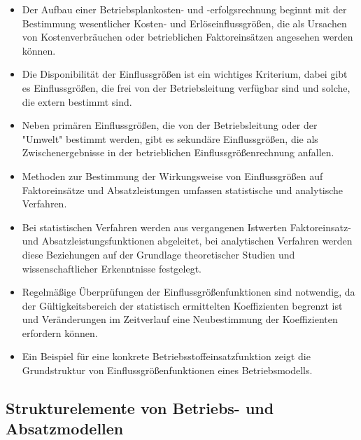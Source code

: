 \begin{itemize}
    \item Der Aufbau einer Betriebsplankosten- und -erfolgsrechnung beginnt mit der Bestimmung wesentlicher Kosten- und Erlöseinflussgrö{\ss}en, die als Ursachen von Kostenverbräuchen oder betrieblichen Faktoreinsätzen angesehen werden können.
    \item Die Disponibilität der Einflussgrö{\ss}en ist ein wichtiges Kriterium, dabei gibt es Einflussgrö{\ss}en, die frei von der Betriebsleitung verfügbar sind und solche, die extern bestimmt sind.
    \item Neben primären Einflussgrö{\ss}en, die von der Betriebsleitung oder der "Umwelt" bestimmt werden, gibt es sekundäre Einflussgrö{\ss}en, die als Zwischenergebnisse in der betrieblichen Einflussgrö{\ss}enrechnung anfallen.
    \item Methoden zur Bestimmung der Wirkungsweise von Einflussgrö{\ss}en auf Faktoreinsätze und Absatzleistungen umfassen statistische und analytische Verfahren.
    \item Bei statistischen Verfahren werden aus vergangenen Istwerten Faktoreinsatz- und Absatzleistungsfunktionen abgeleitet, bei analytischen Verfahren werden diese Beziehungen auf der Grundlage theoretischer Studien und wissenschaftlicher Erkenntnisse festgelegt.
    \item Regelmä{\ss}ige Überprüfungen der Einflussgrö{\ss}enfunktionen sind notwendig, da der Gültigkeitsbereich der statistisch ermittelten Koeffizienten begrenzt ist und Veränderungen im Zeitverlauf eine Neubestimmung der Koeffizienten erfordern können.
    \item Ein Beispiel für eine konkrete Betriebsstoffeinsatzfunktion zeigt die Grundstruktur von Einflussgrö{\ss}enfunktionen eines Betriebsmodells.
\end{itemize}

\subsection{Strukturelemente von Betriebs- und Absatzmodellen}

